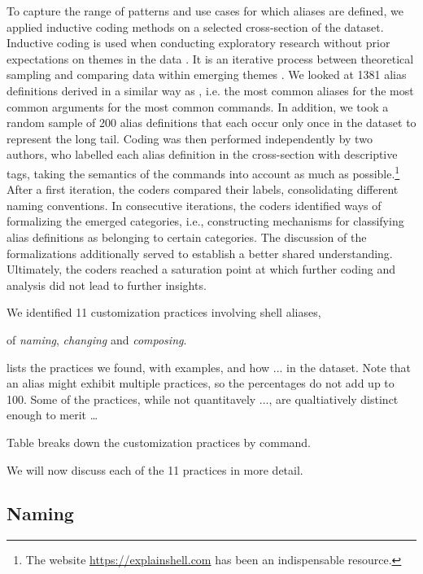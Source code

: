 To capture the range of patterns and use cases for which aliases are defined, we applied inductive coding methods on a selected cross-section of the dataset.
Inductive coding is used when conducting exploratory research without prior expectations on themes in the data \cite{thomas:06}.
It is an iterative process between theoretical sampling and comparing data within emerging themes \cite{dey:03}.
We looked at 1381 alias definitions derived in a similar way as , i.e. the most common aliases for the most common arguments for the most common commands.
In addition, we took a random sample of 200 alias definitions that each occur only once in the dataset to represent the long tail.
Coding was then performed independently by two authors, who labelled each alias definition in the cross-section with descriptive tags, taking the semantics of the commands into account as much as possible.\footnote{The website \url{https://explainshell.com} has been an indispensable resource.}
After a first iteration, the coders compared their labels, consolidating different naming conventions.
In consecutive iterations, the coders identified ways of formalizing the emerged categories, i.e., constructing mechanisms for classifying alias definitions as belonging to certain categories.
The discussion of the formalizations additionally served to establish a better shared understanding.
Ultimately, the coders reached a saturation point at which further coding and analysis did not lead to further insights.

We identified 11 customization practices involving shell aliases,

of \emph{naming}, \emph{changing} and \emph{composing}.

 lists the practices we found, with examples, and how ... in the dataset.
Note that an alias might exhibit multiple practices, so the percentages do not add up to 100.
Some of the practices, while not quantitavely ..., are qualtiatively distinct enough to merit \dots

Table \TODO breaks down the customization practices by command.

We will now discuss each of the 11 practices in more detail.


\subsection{Naming}


